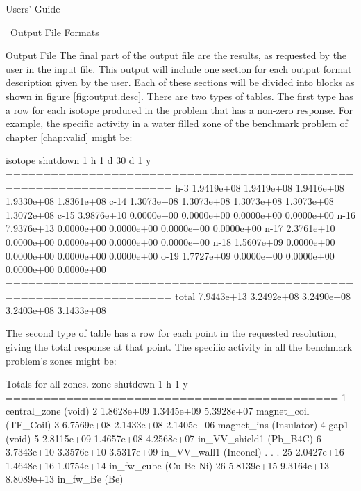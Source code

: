 \begin{chapter}{Users' Guide\label{app:user.guide}}
\begin{section}{\ALARA\ Output File Formats\label{app:user.output}}
\begin{subsection}{Output File}
      The final part of the output file are the results, as requested
      by the user in the input file.  This output will include one
      section for each output format description given by the user.
      Each of these sections will be divided into blocks as shown in
      figure \ref{fig:output.desc}.  There are two types of tables.
      The first type has a row for each isotope produced in the
      problem that has a non-zero response.  For example, the specific
      activity in a water filled zone of the benchmark problem of
      chapter \ref{chap:valid} might be:
      \begin{center}
        \renewcommand{\baselinestretch}{1}\normalsize
        \begin{boxedverbatim}
isotope  shutdown         1 h         1 d        30 d         1 y   
====================================================================
h-3     1.9419e+08  1.9419e+08  1.9416e+08  1.9330e+08  1.8361e+08  
c-14    1.3073e+08  1.3073e+08  1.3073e+08  1.3073e+08  1.3072e+08  
c-15    3.9876e+10  0.0000e+00  0.0000e+00  0.0000e+00  0.0000e+00  
n-16    7.9376e+13  0.0000e+00  0.0000e+00  0.0000e+00  0.0000e+00  
n-17    2.3761e+10  0.0000e+00  0.0000e+00  0.0000e+00  0.0000e+00  
n-18    1.5607e+09  0.0000e+00  0.0000e+00  0.0000e+00  0.0000e+00  
o-19    1.7727e+09  0.0000e+00  0.0000e+00  0.0000e+00  0.0000e+00  
====================================================================
total   7.9443e+13  3.2492e+08  3.2490e+08  3.2403e+08  3.1433e+08  
\end{boxedverbatim}
      \end{center}
      The second type of table has a row for each point in the
      requested resolution, giving the total response at that point.
      The specific activity in all the benchmark problem's zones might
      be:
      \begin{center}
        \renewcommand{\baselinestretch}{1}\normalsize
        \begin{boxedverbatim}
Totals for all zones.
zone     shutdown         1 h         1 y   
============================================
1       central_zone (void)                 
2       1.8628e+09  1.3445e+09  5.3928e+07  magnet_coil (TF_Coil)
3       6.7569e+08  2.1433e+08  2.1405e+06  magnet_ins (Insulator)
4       gap1 (void)                         
5       2.8115e+09  1.4657e+08  4.2568e+07  in_VV_shield1 (Pb_B4C)
6       3.7343e+10  3.3576e+10  3.5317e+09  in_VV_wall1 (Inconel)
.
.
.
25      2.0427e+16  1.4648e+16  1.0754e+14  in_fw_cube (Cu-Be-Ni)
26      5.8139e+15  9.3164e+13  8.8089e+13  in_fw_Be (Be)

\end{boxedverbatim}
\end{center}
\end{subsection}
\end{section}
\end{chapter}
